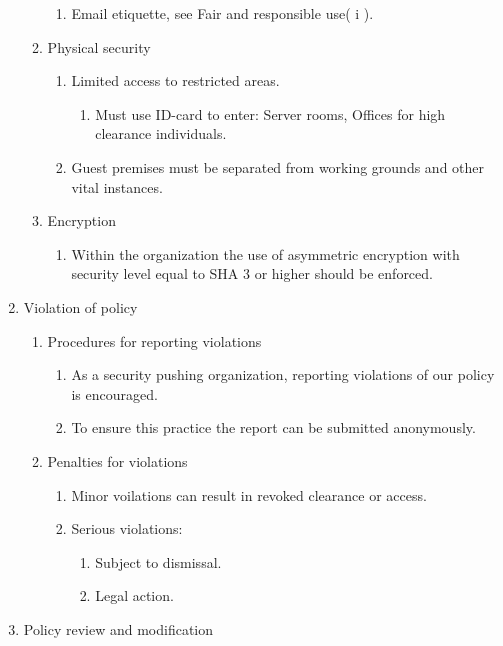 \begin{enumerate}
\begin{enumerate}
\begin{enumerate}
      \item Email etiquette, see Fair and responsible use( i ).
    \end{enumerate}
    \item Physical security
    \begin{enumerate}
      \item Limited access to restricted areas.
      \begin{enumerate}
        \item Must use ID-card to enter: Server rooms, Offices for high clearance individuals.
      \end{enumerate}
      \item Guest premises must be separated from working grounds and other vital instances.
    \end{enumerate}
    \item Encryption
    \begin{enumerate}
      \item Within the organization the use of asymmetric encryption with security level equal to SHA 3 or higher should be enforced.
    \end{enumerate}
  \end{enumerate}
  \item Violation of policy
  \begin{enumerate}
    \item Procedures for reporting violations
    \begin{enumerate}
      \item As a security pushing organization, reporting violations of our policy is encouraged.
      \item To ensure this practice the report can be submitted anonymously.
    \end{enumerate}
      \item Penalties for violations
    \begin{enumerate}
      \item Minor voilations can result in revoked clearance or access.
      \item Serious violations:
      \begin{enumerate}
        \item Subject to dismissal.
        \item Legal action.
      \end{enumerate}
    \end{enumerate}
  \end{enumerate}
  \item Policy review and modification

\end{enumerate}
